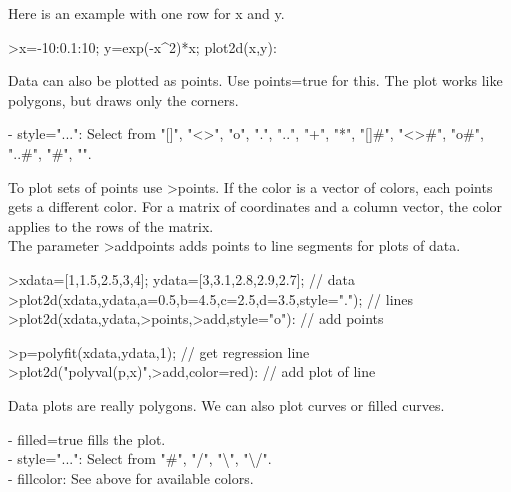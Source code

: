 \documentclass{article}
\begin{document}
\begin{eulernotebook}
\begin{eulercomment}
\begin{eulercomment}
\begin{eulercomment}
\begin{eulercomment}
\begin{eulercomment}
\begin{eulercomment}
\begin{eulercomment}
Here is an example with one row for x and y.

\end{eulercomment}
\begin{eulerprompt}
>x=-10:0.1:10; y=exp(-x^2)*x; plot2d(x,y):
\end{eulerprompt}
\begin{eulercomment}
Data can also be plotted as points. Use points=true for this. The plot works like
polygons, but draws only the corners.

- style="...": Select from "[]", "\textless{}\textgreater{}", "o", ".", "..", "+", "*", "[]#", "\textless{}\textgreater{}#", "o#",
"..#", "#", "\textbar{}".

To plot sets of points use \textgreater{}points. If the color is a vector of colors, each points\\
gets a different color. For a matrix of coordinates and a column vector, the color
applies to the rows of the matrix.\\
The parameter \textgreater{}addpoints adds points to line segments for plots of data.
\end{eulercomment}
\begin{eulerprompt}
>xdata=[1,1.5,2.5,3,4]; ydata=[3,3.1,2.8,2.9,2.7]; // data
>plot2d(xdata,ydata,a=0.5,b=4.5,c=2.5,d=3.5,style="."); // lines
>plot2d(xdata,ydata,>points,>add,style="o"): // add points
\end{eulerprompt}
\begin{eulerprompt}
>p=polyfit(xdata,ydata,1); // get regression line
>plot2d("polyval(p,x)",>add,color=red): // add plot of line
\end{eulerprompt}
\begin{eulercomment}
Data plots are really polygons. We can also plot curves or filled curves.

- filled=true fills the plot.\\
- style="...": Select from "#", "/", "\textbackslash{}", "\textbackslash{}/".\\
- fillcolor: See above for available colors.


\end{eulercomment}
\end{eulercomment}
\end{eulercomment}
\end{eulercomment}
\end{eulercomment}
\end{eulercomment}
\end{eulercomment}
\end{eulernotebook}
\end{document}
